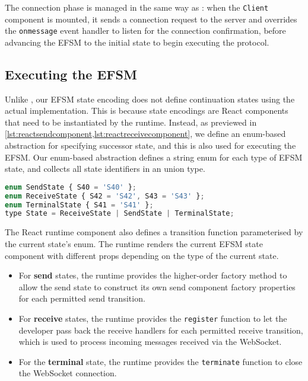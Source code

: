 The connection phase is managed in the same way as \nodecodegen:
when the \texttt{Client} component is mounted,
it sends a connection request to the server and overrides the
\texttt{onmessage} event handler to listen for 
the connection confirmation,
before advancing the EFSM to the initial state to 
begin executing the protocol.

\subsection{Executing the EFSM}
Unlike \nodecodegen, our EFSM state encoding does not define
continuation states using the actual implementation.
This is because state encodings are React components
that need to be instantiated by the runtime.
Instead, as previewed in \cref{lst:reactsendcomponent,lst:reactreceivecomponent},
we define an enum-based abstraction for specifying
successor state, and this is also used for executing the EFSM.
Our enum-based abstraction defines a string enum for each type of EFSM state,
and collects all state identifiers in an union type.

\begin{lstlisting}[language=javascript,numbers=none]
enum SendState { S40 = 'S40' };
enum ReceiveState { S42 = 'S42', S43 = 'S43' };
enum TerminalState { S41 = 'S41' };
type State = ReceiveState | SendState | TerminalState;
\end{lstlisting}

The React runtime component also defines a transition function
parameterised by the current state's enum. The runtime renders
the current EFSM state component with different props depending
on the type of the current state.

\begin{itemize}
\item
For \textbf{send} states, the runtime provides the higher-order factory
method to allow the send state to construct its own send component
factory properties for each permitted send transition.

\item
For \textbf{receive} states, the runtime provides the \texttt{register}
function to let the developer pass back the receive handlers
for each permitted receive transition, which is used
to process incoming messages received via the WebSocket.

\item
For the \textbf{terminal} state, the runtime provides the
\texttt{terminate} function to close the WebSocket connection.
\end{itemize}

